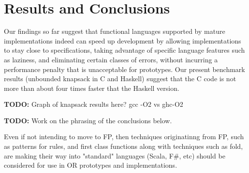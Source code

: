 \section{Results and Conclusions}

Our findings so far suggest that functional languages supported by mature
implementations indeed can speed up development by allowing implementations to
stay close to specifications, taking advantage of specific language features
such as laziness, and eliminating certain classes of errors, without incurring
a performance penalty that is unacceptable for prototypes. Our present
benchmark results (unbounded knapsack in C and Haskell) suggest that the C
code is not more than about four times faster that the Haskell version.

\textbf{TODO:} Graph of knapsack results here? gcc -O2 vs ghc-O2

\textbf{TODO:} Work on the phrasing of the conclusions below.

Even if not intending to move to FP, then techniques originatinng from 
FP, such as patterns for rules, and first class functions  along with 
techniques such as fold, are making their way into "standard" languages 
(Scala, F\#, etc) should be considered for use in OR prototypes and 
implementations.
